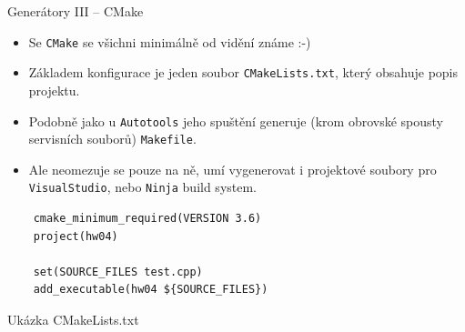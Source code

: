 \documentclass[handout]{beamer}
\begin{document}
\begin{frame}[fragile]{Generátory III -- CMake}
    \begin{itemize}
        \item Se \texttt{CMake} se všichni minimálně od vidění známe :-)
        \item Základem konfigurace je jeden soubor \texttt{CMakeLists.txt}, který obsahuje popis projektu.
        \item Podobně jako u \texttt{Autotools} jeho spuštění generuje (krom obrovské spousty servisních souborů) \texttt{Makefile}.
        \item Ale neomezuje se pouze na ně, umí vygenerovat i projektové soubory pro \texttt{VisualStudio}, nebo \texttt{Ninja} build system.
    \end{itemize}
    \begin{listing}[H]
    \begin{verbatim}
    cmake_minimum_required(VERSION 3.6)
    project(hw04)
     
    set(SOURCE_FILES test.cpp) 
    add_executable(hw04 ${SOURCE_FILES})
    \end{verbatim}
    \caption{Ukázka CMakeLists.txt}
\end{listing}
\end{frame}
\end{document}
